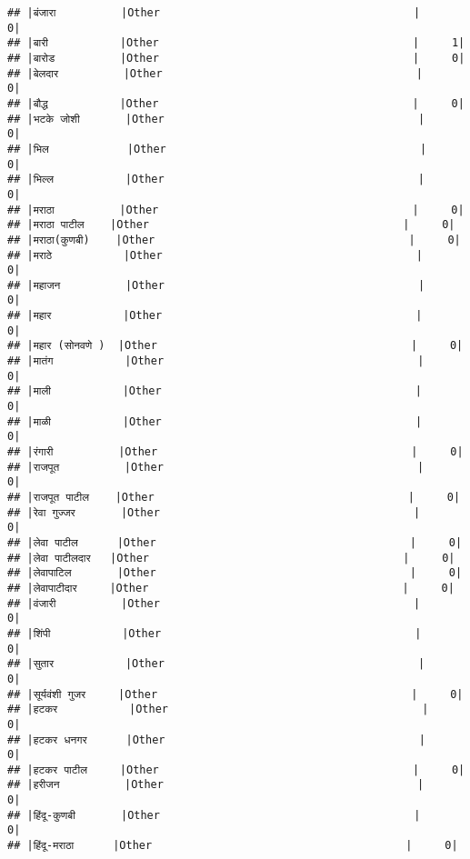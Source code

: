 \documentclass[
]{article}
\begin{document}
\begin{verbatim}
## |बंजारा          |Other                                       |     0|
## |बारी           |Other                                       |     1|
## |बारोड          |Other                                       |     0|
## |बेलदार          |Other                                       |     0|
## |बौद्ध           |Other                                       |     0|
## |भटके जोशी       |Other                                       |     0|
## |भिल            |Other                                       |     0|
## |भिल्ल           |Other                                       |     0|
## |मराठा          |Other                                       |     0|
## |मराठा पाटील    |Other                                       |     0|
## |मराठा(कुणबी)    |Other                                       |     0|
## |मराठे           |Other                                       |     0|
## |महाजन          |Other                                       |     0|
## |महार           |Other                                       |     0|
## |महार (सोनवणे )  |Other                                       |     0|
## |मातंग           |Other                                       |     0|
## |माली           |Other                                       |     0|
## |माळी           |Other                                       |     0|
## |रंगारी          |Other                                       |     0|
## |राजपूत          |Other                                       |     0|
## |राजपूत पाटील    |Other                                       |     0|
## |रेवा गुज्जर       |Other                                       |     0|
## |लेवा पाटील      |Other                                       |     0|
## |लेवा पाटीलदार   |Other                                       |     0|
## |लेवापाटिल       |Other                                       |     0|
## |लेवापाटीदार     |Other                                       |     0|
## |वंजारी          |Other                                       |     0|
## |शिंपी           |Other                                       |     0|
## |सुतार           |Other                                       |     0|
## |सूर्यवंशी गुजर     |Other                                       |     0|
## |हटकर           |Other                                       |     0|
## |हटकर धनगर      |Other                                       |     0|
## |हटकर पाटील     |Other                                       |     0|
## |हरीजन          |Other                                       |     0|
## |हिंदू-कुणबी       |Other                                       |     0|
## |हिंदू-मराठा      |Other                                       |     0|

\end{verbatim}
\end{document}
